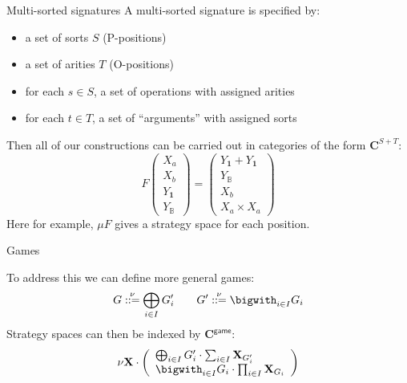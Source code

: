 \documentclass[aspectratio=1610,mathserif]{beamer}
\begin{document}
\begin{frame}{Multi-sorted signatures}
  A multi-sorted signature is specified by:
  \begin{itemize}
    \item a set of sorts $S$ (P-positions)
    \item a set of arities $T$ (O-positions)
    \item for each $s \in S$, a set of operations with assigned arities
    \item for each $t \in T$, a set of ``arguments'' with assigned sorts
  \end{itemize}

  \vfill
  Then all of our constructions can be carried out in
  categories of the form $\mathbf{C}^{S + T}$:
  \[
    F \left( \begin{array}{c}
             X_a \\ X_b \\ Y_\mathbf{1} \\ Y_\mathbb{B}
             \end{array} \right) =
    \left( \begin{array}{c}
             Y_\mathbf{1} + Y_\mathbf{1} \\
             Y_\mathbb{B} \\
             X_b \\
             X_a \times X_a
           \end{array} \right)
  \]
  Here for example, $\mu F$ gives a strategy space for each position.
\end{frame}

\begin{frame}[fragile]{Games}

  To address this we can define more general games:
  \[ G \stackrel{\nu}{::=} \bigoplus_{i \in I} G'_i
     \qquad
     G' \stackrel{\nu}{::=} \bigwith_{i \in I} G_i \]
  Strategy spaces can then be indexed by $\mathbf{C}^\mathsf{game}$:
  \[
    \nu \mathbf{X} \cdot \left(
      \begin{array}{l}
        \bigoplus_{i \in I} G'_i \cdot \sum_{i \in I} \mathbf{X}_{G'_i} \\
        \bigwith_{i \in I} G_i \cdot \prod_{i \in I} \mathbf{X}_{G_i}
      \end{array}
    \right)
  \]
\end{frame}
\end{document}
